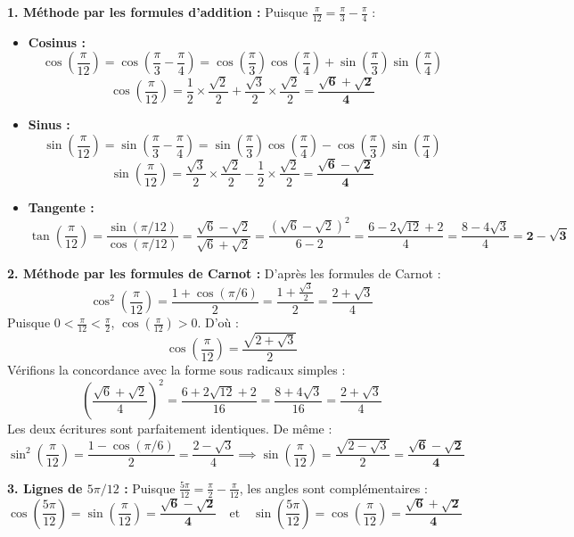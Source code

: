 \documentclass[11pt,a4paper]{article}
\begin{document}
\begin{correctionbox}
\textbf{1. Méthode par les formules d'addition :}
Puisque $\frac{\pi}{12} = \frac{\pi}{3} - \frac{\pi}{4}$ :
\begin{itemize}[label=$\bullet$]
    \item \textbf{Cosinus :}
    \[
    \cos\left(\frac{\pi}{12}\right) = \cos\left(\frac{\pi}{3} - \frac{\pi}{4}\right) = \cos\left(\frac{\pi}{3}\right)\cos\left(\frac{\pi}{4}\right) + \sin\left(\frac{\pi}{3}\right)\sin\left(\frac{\pi}{4}\right)
    \]
    \[
    \cos\left(\frac{\pi}{12}\right) = \frac{1}{2} \times \frac{\sqrt{2}}{2} + \frac{\sqrt{3}}{2} \times \frac{\sqrt{2}}{2} = \mathbf{\frac{\sqrt{6} + \sqrt{2}}{4}}
    \]
    \item \textbf{Sinus :}
    \[
    \sin\left(\frac{\pi}{12}\right) = \sin\left(\frac{\pi}{3} - \frac{\pi}{4}\right) = \sin\left(\frac{\pi}{3}\right)\cos\left(\frac{\pi}{4}\right) - \cos\left(\frac{\pi}{3}\right)\sin\left(\frac{\pi}{4}\right)
    \]
    \[
    \sin\left(\frac{\pi}{12}\right) = \frac{\sqrt{3}}{2} \times \frac{\sqrt{2}}{2} - \frac{1}{2} \times \frac{\sqrt{2}}{2} = \mathbf{\frac{\sqrt{6} - \sqrt{2}}{4}}
    \]
    \item \textbf{Tangente :}
    \[
    \tan\left(\frac{\pi}{12}\right) = \frac{\sin(\pi/12)}{\cos(\pi/12)} = \frac{\sqrt{6} - \sqrt{2}}{\sqrt{6} + \sqrt{2}} = \frac{(\sqrt{6} - \sqrt{2})^2}{6 - 2} = \frac{6 - 2\sqrt{12} + 2}{4} = \frac{8 - 4\sqrt{3}}{4} = \mathbf{2 - \sqrt{3}}
    \]
\end{itemize}

\textbf{2. Méthode par les formules de Carnot :}
D'après les formules de Carnot :
\[
\cos^2\left(\frac{\pi}{12}\right) = \frac{1 + \cos(\pi/6)}{2} = \frac{1 + \frac{\sqrt{3}}{2}}{2} = \frac{2 + \sqrt{3}}{4}
\]
Puisque $0 < \frac{\pi}{12} < \frac{\pi}{2}$, $\cos\left(\frac{\pi}{12}\right) > 0$. D'où :
\[
\cos\left(\frac{\pi}{12}\right) = \frac{\sqrt{2 + \sqrt{3}}}{2}
\]
Vérifions la concordance avec la forme sous radicaux simples :
\[
\left(\frac{\sqrt{6} + \sqrt{2}}{4}\right)^2 = \frac{6 + 2\sqrt{12} + 2}{16} = \frac{8 + 4\sqrt{3}}{16} = \frac{2 + \sqrt{3}}{4}
\]
Les deux écritures sont parfaitement identiques. De même :
\[
\sin^2\left(\frac{\pi}{12}\right) = \frac{1 - \cos(\pi/6)}{2} = \frac{2 - \sqrt{3}}{4} \implies \sin\left(\frac{\pi}{12}\right) = \frac{\sqrt{2 - \sqrt{3}}}{2} = \mathbf{\frac{\sqrt{6} - \sqrt{2}}{4}}
\]

\textbf{3. Lignes de $5\pi/12$ :}
Puisque $\frac{5\pi}{12} = \frac{\pi}{2} - \frac{\pi}{12}$, les angles sont complémentaires :
\[
\cos\left(\frac{5\pi}{12}\right) = \sin\left(\frac{\pi}{12}\right) = \mathbf{\frac{\sqrt{6} - \sqrt{2}}{4}} \quad \text{et} \quad \sin\left(\frac{5\pi}{12}\right) = \cos\left(\frac{\pi}{12}\right) = \mathbf{\frac{\sqrt{6} + \sqrt{2}}{4}}
\]
\end{correctionbox}
\end{document}
